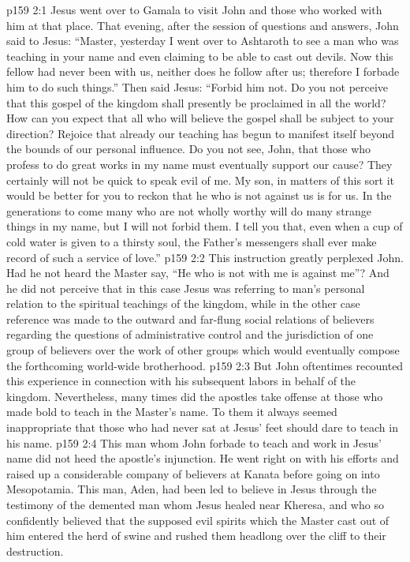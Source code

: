 \vs p159 2:1 Jesus went over to Gamala to visit John and those who worked with him at that place. That evening, after the session of questions and answers, John said to Jesus: “Master, yesterday I went over to Ashtaroth to see a man who was teaching in your name and even claiming to be able to cast out devils. Now this fellow had never been with us, neither does he follow after us; therefore I forbade him to do such things.” Then said Jesus: \textcolor{ubdarkred}{“Forbid him not. Do you not perceive that this gospel of the kingdom shall presently be proclaimed in all the world? How can you expect that all who will believe the gospel shall be subject to your direction? Rejoice that already our teaching has begun to manifest itself beyond the bounds of our personal influence. Do you not see, John, that those who profess to do great works in my name must eventually support our cause? They certainly will not be quick to speak evil of me. My son, in matters of this sort it would be better for you to reckon that he who is not against us is for us. In the generations to come many who are not wholly worthy will do many strange things in my name, but I will not forbid them. I tell you that, even when a cup of cold water is given to a thirsty soul, the Father’s messengers shall ever make record of such a service of love.”}
\vs p159 2:2 This instruction greatly perplexed John. Had he not heard the Master say, \textcolor{ubdarkred}{“He who is not with me is against me”?} And he did not perceive that in this case Jesus was referring to man’s personal relation to the spiritual teachings of the kingdom, while in the other case reference was made to the outward and far\hyp{}flung social relations of believers regarding the questions of administrative control and the jurisdiction of one group of believers over the work of other groups which would eventually compose the forthcoming world\hyp{}wide brotherhood.
\vs p159 2:3 But John oftentimes recounted this experience in connection with his subsequent labors in behalf of the kingdom. Nevertheless, many times did the apostles take offense at those who made bold to teach in the Master’s name. To them it always seemed inappropriate that those who had never sat at Jesus’ feet should dare to teach in his name.
\vs p159 2:4 This man whom John forbade to teach and work in Jesus’ name did not heed the apostle’s injunction. He went right on with his efforts and raised up a considerable company of believers at Kanata before going on into Mesopotamia. This man, Aden, had been led to believe in Jesus through the testimony of the demented man whom Jesus healed near Kheresa, and who so confidently believed that the supposed evil spirits which the Master cast out of him entered the herd of swine and rushed them headlong over the cliff to their destruction.
